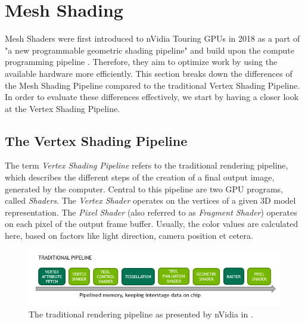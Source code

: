 \chapter{Mesh Shading} \label{cpt-mesh-shading}


Mesh Shaders were first introduced to nVidia Touring \ac{GPU}s in 2018 as a part of
"a new programmable geometric shading pipeline" and build upon the compute programming 
pipeline \cite[Christoph Kubisch]{Kubisch2018}. Therefore, they aim to optimize work by 
using the available hardware more efficiently. This section breaks down the differences 
of the Mesh Shading Pipeline compared to the traditional Vertex Shading Pipeline. In order 
to evaluate these differences effectively, we start by having a closer look at the 
Vertex Shading Pipeline.

\section{The Vertex Shading Pipeline} \label{sec-vertex-shading-pipeline}

The term \emph{Vertex Shading Pipeline} refers to the traditional rendering pipeline, which 
describes the different steps of the creation of a final output image, generated by the 
computer. Central to this pipeline are two \ac{GPU} programs, called \emph{Shaders}. The 
\emph{Vertex Shader} operates on the vertices of a given 3D model representation. 
The \emph{Pixel Shader} (also referred to as \emph{Fragment Shader}) operates on each pixel 
of the output frame buffer. Usually, the color values are calculated here, based on factors 
like light direction, camera position et cetera. \\

\begin{figure}[h]
    \centering
    \includegraphics[width=\linewidth]{images/graphics/traditional-rendering-pipeline.png}
    \caption{The traditional rendering pipeline as presented by nVidia in \cite[Christoph Kubisch]{Kubisch2018}.}
    \label{fig:traditional-rendering-pipeline}
\end{figure}

